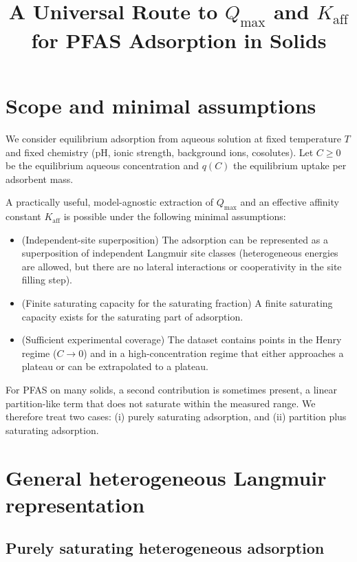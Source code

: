 \documentclass[12pt]{article}
\begin{document}
	
	\title{A Universal Route to $Q_{\max}$ and $K_{\mathrm{aff}}$ for PFAS Adsorption in Solids}
	\author{}
	\date{}
	\maketitle
	
	\section{Scope and minimal assumptions}
	
	We consider equilibrium adsorption from aqueous solution at fixed temperature $T$ and fixed chemistry (pH, ionic strength, background ions, cosolutes). Let $C \ge 0$ be the equilibrium aqueous concentration and $q(C)$ the equilibrium uptake per adsorbent mass.
	
	A practically useful, model-agnostic extraction of $Q_{\max}$ and an effective affinity constant $K_{\mathrm{aff}}$ is possible under the following minimal assumptions:
	
	\begin{itemize}
		\item[A1.] (Independent-site superposition) The adsorption can be represented as a superposition of independent Langmuir site classes (heterogeneous energies are allowed, but there are no lateral interactions or cooperativity in the site filling step).
		\item[A2.] (Finite saturating capacity for the saturating fraction) A finite saturating capacity exists for the saturating part of adsorption.
		\item[A3.] (Sufficient experimental coverage) The dataset contains points in the Henry regime ($C \to 0$) and in a high-concentration regime that either approaches a plateau or can be extrapolated to a plateau.
	\end{itemize}
	
	For PFAS on many solids, a second contribution is sometimes present, a linear partition-like term that does not saturate within the measured range. We therefore treat two cases:
	(i) purely saturating adsorption, and (ii) partition plus saturating adsorption.
	
	\section{General heterogeneous Langmuir representation}
	
	\subsection{Purely saturating heterogeneous adsorption}
	
\end{document}
